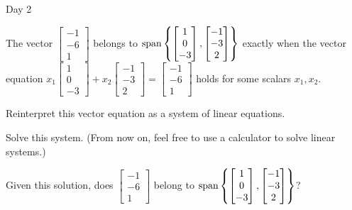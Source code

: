 \begin{applicationActivities}{Day 2}
\begin{activity}{10}
  The vector
  \(\begin{bmatrix}-1\\-6\\1\end{bmatrix}\) belongs to
  \(\operatorname{span}\left\{\begin{bmatrix}1\\0\\-3\end{bmatrix},
  \begin{bmatrix}-1\\-3\\2\end{bmatrix}\right\}\) exactly when
  the vector equation
  \(x_1\begin{bmatrix}1\\0\\-3\end{bmatrix}+
  x_2\begin{bmatrix}-1\\-3\\2\end{bmatrix}
  =\begin{bmatrix}-1\\-6\\1\end{bmatrix}\) holds for some scalars
  \(x_1,x_2\).
  \begin{subactivity}
    Reinterpret this vector equation as a system of linear equations.
  \end{subactivity}
  \begin{subactivity}
    Solve this system. (From now on, feel free to use a calculator
    to solve linear systems.)
  \end{subactivity}
  \begin{subactivity}
    Given this solution, does
    \(\begin{bmatrix}-1\\-6\\1\end{bmatrix}\) belong to
    \(\operatorname{span}\left\{\begin{bmatrix}1\\0\\-3\end{bmatrix},
    \begin{bmatrix}-1\\-3\\2\end{bmatrix}\right\}\)?
  \end{subactivity}
\end{activity}


\end{applicationActivities}
